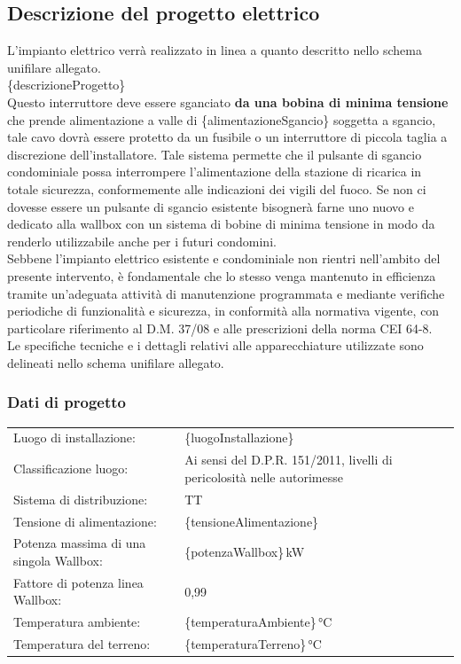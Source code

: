 \subsection{Descrizione del progetto elettrico}
L’impianto elettrico verrà realizzato in linea a quanto descritto nello schema unifilare allegato. \\
\{descrizioneProgetto\} \\
Questo interruttore deve essere sganciato \textbf{da una bobina di minima tensione} che prende alimentazione a valle di \{alimentazioneSgancio\} soggetta a sgancio, tale cavo dovrà essere protetto da un fusibile o un interruttore di piccola taglia a discrezione dell'installatore. Tale sistema permette che il pulsante di sgancio condominiale possa interrompere l'alimentazione della stazione di ricarica in totale sicurezza, conformemente alle indicazioni dei vigili del fuoco. Se non ci dovesse essere un pulsante di sgancio esistente bisognerà farne uno nuovo e dedicato alla wallbox con un sistema di bobine di minima tensione in modo da renderlo utilizzabile anche per i futuri condomini. \\
Sebbene l’impianto elettrico esistente e condominiale non rientri nell’ambito del presente intervento, è fondamentale che lo stesso venga mantenuto in efficienza tramite un’adeguata attività di manutenzione programmata e mediante verifiche periodiche di funzionalità e sicurezza, in conformità alla normativa vigente, con particolare riferimento al D.M. 37/08 e alle prescrizioni della norma CEI 64-8. \\
Le specifiche tecniche e i dettagli relativi alle apparecchiature utilizzate sono delineati nello schema unifilare allegato.

\subsubsection{Dati di progetto}
\begin{center}
\begin{tabularx}{\textwidth}{lX}
Luogo di installazione:              & \{luogoInstallazione\} \\
Classificazione luogo:               & Ai sensi del D.P.R. 151/2011, livelli di pericolosità nelle autorimesse \\
Sistema di distribuzione:            & TT \\
Tensione di alimentazione:           & \{tensioneAlimentazione\} \\
Potenza massima di una singola Wallbox: & \{potenzaWallbox\}\,kW \\
Fattore di potenza linea Wallbox:    & 0,99 \\
Temperatura ambiente:                & \{temperaturaAmbiente\}\,°C \\
Temperatura del terreno:             & \{temperaturaTerreno\}\,°C \\
\end{tabularx}
\end{center}

